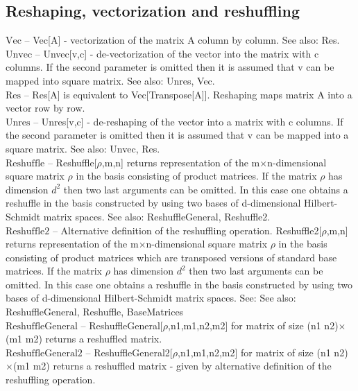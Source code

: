 \subsection{Reshaping, vectorization and reshuffling}

\noindent\textbf{$ \text{Vec} $ }-- Vec[A] - vectorization of the matrix A column by column. See also: Res.$  $\\
\noindent\textbf{$ \text{Unvec} $ }-- Unvec[v,c] - de-vectorization of the vector into the matrix with c columns. If the second parameter is omitted then it is assumed that v can be mapped into square matrix. See also: Unres, Vec.$  $\\
\noindent\textbf{$ \text{Res} $ }-- Res[A] is equivalent to Vec[Transpose[A]]. Reshaping maps matrix A into a vector row by row.$  $\\
\noindent\textbf{$ \text{Unres} $ }-- Unres[v,c] - de-reshaping of the vector into a matrix with c columns. If the second parameter is omitted then it is assumed that v can be mapped into a square matrix. See also: Unvec, Res.$  $\\
\noindent\textbf{$ \text{Reshuffle} $ }-- Reshuffle[$\rho $,m,n] returns representation of the m$\times $n-dimensional square matrix $\rho $ in the basis consisting of product matrices. If  the matrix $\rho $ has dimension $ d^2 $ then two last arguments can be omitted. In this case one obtains a reshuffle in the basis constructed by using two bases of d-dimensional Hilbert-Schmidt matrix spaces. See also: ReshuffleGeneral, Reshuffle2.$  $\\
\noindent\textbf{$ \text{Reshuffle2} $ }-- Alternative definition of the reshuffling operation. Reshuffle2[$\rho $,m,n] returns representation of the m$\times $n-dimensional square matrix $\rho $ in the basis consisting of product matrices which are transposed versions of standard base matrices. If the matrix $\rho $ has dimension $ d^2 $ then two last arguments can be omitted. In this case one obtains a reshuffle in the basis constructed by using two bases of d-dimensional Hilbert-Schmidt matrix spaces. See: See also: ReshuffleGeneral, Reshuffle, BaseMatrices$  $\\
\noindent\textbf{$ \text{ReshuffleGeneral} $ }-- ReshuffleGeneral[$\rho $,n1,m1,n2,m2] for matrix of size (n1 n2)$\times $(m1 m2) returns a reshuffled matrix.$  $\\
\noindent\textbf{$ \text{ReshuffleGeneral2} $ }-- ReshuffleGeneral2[$\rho $,n1,m1,n2,m2] for matrix of size (n1 n2)$\times $(m1 m2) returns a reshuffled matrix - given by alternative definition of the reshuffling operation.$  $\\
